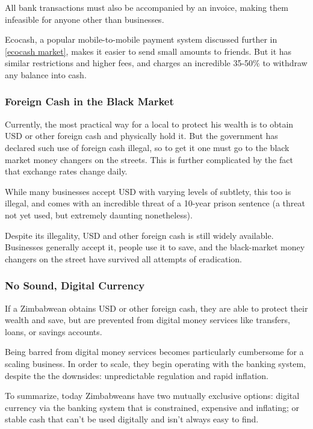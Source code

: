 \documentclass{article}
\begin{document}
All bank transactions must also be accompanied by an invoice, making them infeasible for anyone other than businesses.

Ecocash, a popular mobile-to-mobile payment system discussed further in \ref{ecocash market}, makes it easier to send small amounts to friends. But it has similar restrictions and higher fees, and charges an incredible 35-50\% to withdraw any balance into cash.

\subsubsection{Foreign Cash in the Black Market} \label{usd}

Currently, the most practical way for a local to protect his wealth is to obtain USD or other foreign cash and physically hold it. But the government has declared such use of foreign cash illegal, so to get it one must go to the black market money changers on the streets. This is further complicated by the fact that exchange rates change daily.

While many businesses accept USD with varying levels of subtlety, this too is illegal, and comes with an incredible threat of a 10-year prison sentence (a threat not yet used, but extremely daunting nonetheless).

Despite its illegality, USD and other foreign cash is still widely available. Businesses generally accept it, people use it to save, and the black-market money changers on the street have survived all attempts of eradication.

\subsubsection{No Sound, Digital Currency} \label{gap}

If a Zimbabwean obtains USD or other foreign cash, they are able to protect their wealth and save, but are prevented from digital money services like transfers, loans, or savings accounts.

Being barred from digital money services becomes particularly cumbersome for a scaling business. In order to scale, they begin operating with the banking system, despite the the downsides: unpredictable regulation and rapid inflation.

To summarize, today Zimbabweans have two mutually exclusive options: digital currency via the banking system that is constrained, expensive and inflating; or stable cash that can't be used digitally and isn't always easy to find.
\end{document}
